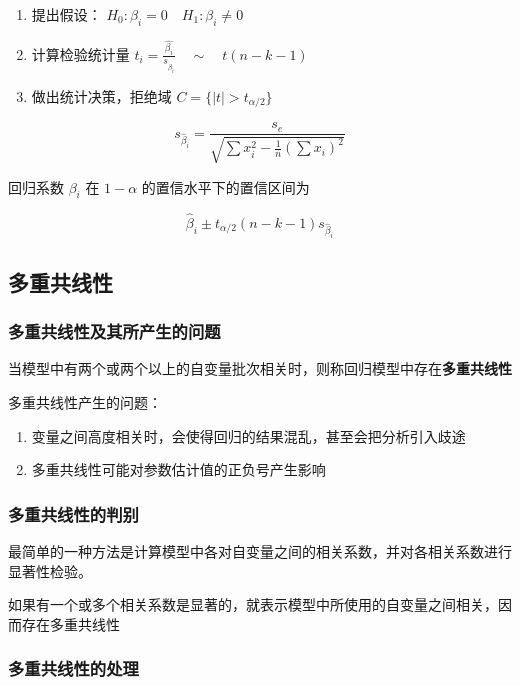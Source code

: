 \documentclass[UTF8,10pt]{book}
\begin{document}
{\begin{enumerate}
	\def\labelenumi{\arabic{enumi}.}
	\item
	提出假设： \(H_0 : \beta_i = 0  \quad H_1 : \beta_i \neq 0\) 
	\item
	计算检验统计量
	\(t_i = \frac{\hat{\beta_i}}{s_{\hat{\beta_i}}} \quad \sim \quad t(n-k-1)\)
	\item
	做出统计决策，拒绝域 \( C = \{ |t|>t_{\alpha / 2} \} \)
\end{enumerate}

\[s_{\hat{\beta}_i} = \frac{s_e}{\sqrt{\sum x_i^2 - \frac{1}{n}\left(\sum x_i\right)^2}}\]

回归系数 \(\beta_i\) 在 \(1-\alpha\) 的置信水平下的置信区间为

\[\hat{\beta}_i \pm t_{\alpha /2}(n-k-1)s_{\hat{\beta}_i}\]

\subsection{多重共线性}\label{header-n258}

\subsubsection{多重共线性及其所产生的问题}\label{header-n259}

当模型中有两个或两个以上的自变量批次相关时，则称回归模型中存在\textbf{多重共线性}

多重共线性产生的问题：

\begin{enumerate}
	\def\labelenumi{\arabic{enumi}.}
	\item
	变量之间高度相关时，会使得回归的结果混乱，甚至会把分析引入歧途
	\item
	多重共线性可能对参数估计值的正负号产生影响
\end{enumerate}

\subsubsection{多重共线性的判别}\label{header-n267}

最简单的一种方法是计算模型中各对自变量之间的相关系数，并对各相关系数进行显著性检验。

{\kaishu 如果有一个或多个相关系数是显著的，就表示模型中所使用的自变量之间相关，因而存在多重共线性}

\subsubsection{多重共线性的处理}\label{header-n269}

}
\end{document}
